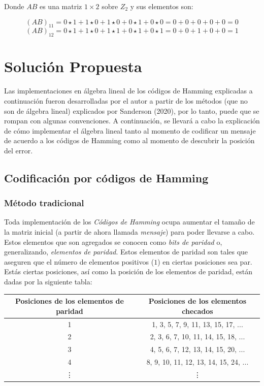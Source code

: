\documentclass{article}
\begin{document}
Donde $AB$ es una matriz $1 \times 2$ sobre $Z_2$ y sus elementos son:

$$
(AB)_{11} = 0 \star 1 + 1 \star 0 + 1 \star 0 + 0 \star 1 + 0 \star 0 = 0 + 0 + 0 + 0 + 0 = 0
$$$$
(AB)_{12} = 0 \star 1 + 1 \star 0 + 1 \star 1 + 0 \star 1 + 0 \star 1 = 0 + 0 + 1 + 0 + 0 = 1
$$

\section{Solución Propuesta}

Las implementaciones en álgebra lineal de los códigos de Hamming explicadas a continuación fueron desarrolladas por el autor a partir de los métodos (que no son de álgebra lineal) explicados por Sanderson (2020), por lo tanto, puede que se rompan con algunas convenciones. A continuación, se llevará a cabo la explicación de cómo implementar el álgebra lineal tanto al momento de codificar un mensaje de acuerdo a los códigos de Hamming como al momento de descubrir la posición del error.

\subsection{Codificación por códigos de Hamming}

\subsubsection{Método tradicional}

Toda implementación de los \textit{Códigos de Hamming} ocupa aumentar el tamaño de la matriz inicial (a partir de ahora llamada \textit{mensaje}) para poder llevarse a cabo. Estos elementos que son agregados se conocen como \textit{bits de paridad} o, generalizando, \textit{elementos de paridad}. Estos elementos de paridad son tales que aseguren que el número de elementos positivos ($1$) en ciertas posiciones sea par. Estás ciertas posiciones, así como la posición de los elementos de paridad, están dadas por la siguiente tabla:

\begin{center}
\begin{tabular}{ |c|c| } 
 \hline
 Posiciones de los elementos de paridad & Posiciones de los elementos checados \\ 
 \hline
 1 & 1, 3, 5, 7, 9, 11, 13, 15, 17, ... \\ 
 2 & 2, 3, 6, 7, 10, 11, 14, 15, 18, ... \\ 
 3 & 4, 5, 6, 7, 12, 13, 14, 15, 20, ... \\
 4 & 8, 9, 10, 11, 12, 13, 14, 15, 24, ...\\
 \vdots & \vdots \\
 \hline
\end{tabular}
\end{center}
\end{document}
